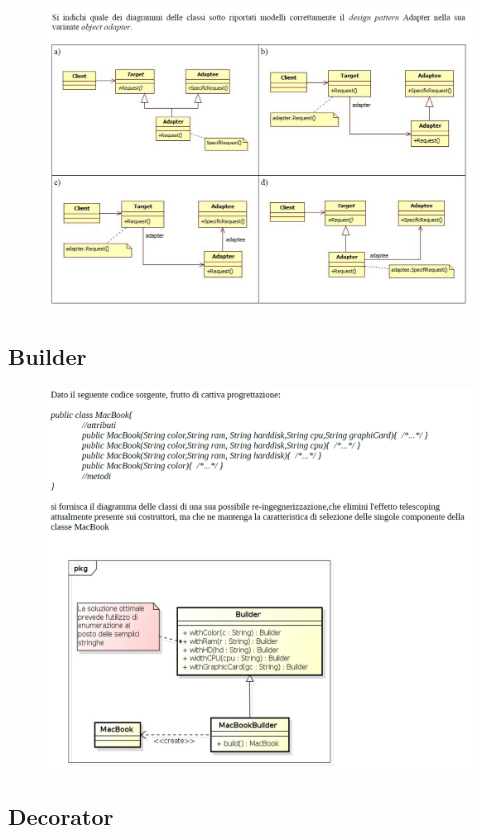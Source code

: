 \begin{figure}
\includegraphics[width=1\textwidth]{res/img/Esercizi/es-adapter}
\end{figure}

\subsection{Builder}
\begin{figure}
\includegraphics[width=1\textwidth]{res/img/Esercizi/es-builder}
\end{figure}

\subsection{Decorator}

